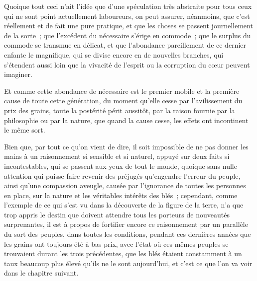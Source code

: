 \documentclass[french,twoside]{book} %
\begin{document}
Quoique tout ceci n’ait l’idée que d’une spéculation très abstraite pour tous ceux qui ne sont point actuellement laboureurs, on peut assurer, néanmoins, que c’est réellement et de fait une pure pratique, et que les choses se passent journellement de la sorte ; que l’excédent du nécessaire s’érige en commode ; que le surplus du commode se transmue en délicat, et que l’abondance pareillement de ce dernier enfante le magnifique, qui se divise encore en de nouvelles branches, qui s’étendent aussi loin que la vivacité de l’esprit ou la corruption du cœur peuvent imaginer.\par
Et comme cette abondance de nécessaire est le premier mobile et la première cause de toute cette génération, du moment qu’elle cesse par l’avilissement du prix des grains, toute la postérité périt aussitôt, par la raison fournie par la philosophie ou par la nature, que quand la cause cesse, les effets ont incontinent le même sort.\par
Bien que, par tout ce qu’on vient de dire, il soit impossible de ne pas donner les mains à un raisonnement si sensible et si naturel, appuyé sur deux faits si incontestables, qui se passent aux yeux de tout le monde, quoique sans nulle attention qui puisse faire revenir des préjugés qu’engendre l’erreur du peuple, ainsi qu’une compassion aveugle, causée par l’ignorance de toutes les personnes en place, sur la nature et les véritables intérêts des blés ; cependant, comme l’exemple de ce qui s’est vu dans la découverte de la figure de la terre, n’a que trop appris le destin que doivent attendre tous les porteurs de nouveautés surprenantes, il est à propos de fortifier encore ce raisonnement par un parallèle du sort des peuples, dans toutes les conditions, pendant ces dernières années que les grains ont toujours été à bas prix, avec l’état où ces mêmes peuples se trouvaient durant les trois précédentes, que les blés étaient constamment à un taux beaucoup plus élevé qu’ils ne le sont aujourd’hui, et c’est ce que l’on va voir dans le chapitre suivant.
\end{document}
